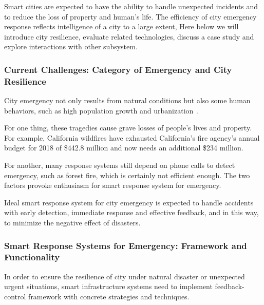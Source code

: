 \documentclass[letterpaper, twocolumn, 10pt, conference]{IEEEtran}
\begin{document}
Smart cities are expected to have the ability to handle unexpected incidents and to reduce the loss of property and human’s life. The efficiency of city emergency response reflects intelligence of a city to a large extent, 
Here below we will introduce city resilience, evaluate related technologies, discuss a case study and explore interactions with other subsystem.


\subsubsection{Current Challenges: Category of Emergency and City Resilience}
\label{sssec:zj:smart_emergency:challenges}

City emergency not only results from natural conditions but also some human behaviors, such as high population growth and urbanization~\cite{yang2017using}. 

For one thing, these tragedies cause grave losses of people’s lives and property. For example, California wildfires have exhausted California's fire agency’s annual budget for 2018 of \$442.8 million and now needs an additional \$234 million. 

For another, many response systems still depend on phone calls to detect emergency, such as forest fire, which is certainly not efficient enough. The two factors provoke enthusiasm for smart response system for emergency.

Ideal smart response system for city emergency is expected to handle accidents with early detection, immediate response and effective feedback, and in this way, to minimize the negative effect of disasters.


\subsubsection{Smart Response Systems for Emergency: Framework and Functionality}
\label{sssec:zj:smart_emergency:framework}


In order to ensure the resilience of city under natural disaster or unexpected urgent situations, smart infrastructure systems need to implement feedback-control framework with concrete strategies and techniques. 
\end{document}
